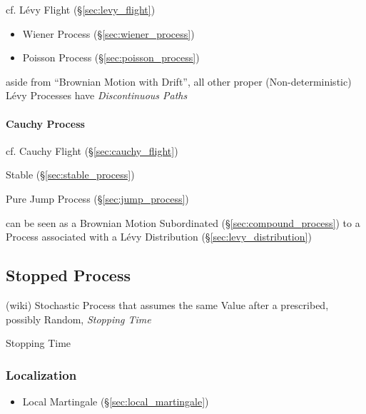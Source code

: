 \fist cf. L\'evy Flight (\S\ref{sec:levy_flight})

\begin{itemize}
  \item Wiener Process (\S\ref{sec:wiener_process})
  \item Poisson Process (\S\ref{sec:poisson_process})
\end{itemize}

aside from ``Brownian Motion with Drift'', all other proper (Non-deterministic)
L\'evy Processes have \emph{Discontinuous Paths}



\paragraph{Cauchy Process}\label{sec:cauchy_process}\hfill

\fist cf. Cauchy Flight (\S\ref{sec:cauchy_flight})

Stable (\S\ref{sec:stable_process})

Pure Jump Process (\S\ref{sec:jump_process})

can be seen as a Brownian Motion Subordinated (\S\ref{sec:compound_process}) to a
Process associated with a L\'evy Distribution (\S\ref{sec:levy_distribution})



\subsection{Stopped Process}\label{sec:stopped_process}

(wiki) Stochastic Process that assumes the same Value after a prescribed,
possibly Random, \emph{Stopping Time}

Stopping Time



\subsubsection{Localization}\label{sec:localization}

\begin{itemize}
  \item Local Martingale (\S\ref{sec:local_martingale})
\end{itemize}



